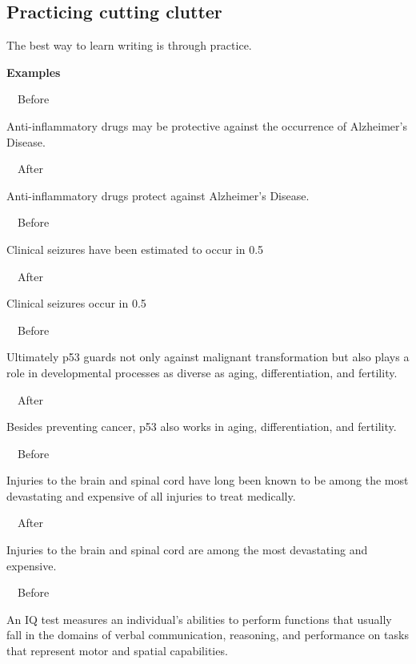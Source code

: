 \documentclass[a4paper, 12pt]{article}
\begin{document}
\newpage\subsection{Practicing cutting clutter}

The best way to learn writing is through practice.

\par\textbf{Examples}

\par\ \textbullet\ Before
\par Anti-inflammatory drugs may be protective against the occurrence of Alzheimer’s Disease.

\par\ \textbullet\ After
\par Anti-inflammatory drugs protect against Alzheimer’s Disease.

\par\ \textbullet\ Before
\par Clinical seizures have been estimated to occur in 0.5%

\par\ \textbullet\ After
\par Clinical seizures occur in 0.5%

\par\ \textbullet\ Before
\par Ultimately p53 guards not only against malignant transformation but also plays a role in developmental processes as diverse as aging, differentiation, and fertility.

\par\ \textbullet\ After
\par Besides preventing cancer, p53 also works in aging, differentiation, and fertility.

\par\ \textbullet\ Before
\par Injuries to the brain and spinal cord have long been known to be among the most devastating and expensive of all injuries to treat medically.

\par\ \textbullet\ After
\par Injuries to the brain and spinal cord are among the most devastating and expensive.

\par\ \textbullet\ Before
\par An IQ test measures an individual's abilities to perform functions that usually fall in the domains of verbal communication, reasoning, and performance on tasks that represent motor and spatial capabilities.
\end{document}
